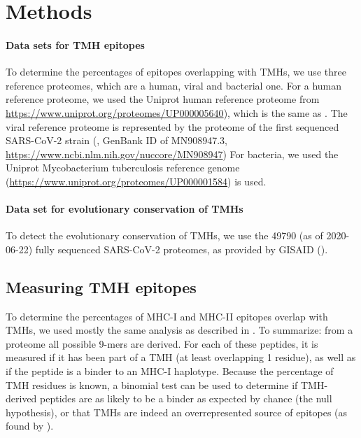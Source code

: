 \section{Methods}

\paragraph{Data sets for TMH epitopes}

To determine the percentages of epitopes overlapping
with TMHs, we use three reference proteomes, which are
a human, viral and bacterial one.
For a human reference proteome, we used the Uniprot human reference proteome
from \url{https://www.uniprot.org/proteomes/UP000005640}), 
which is the same as \cite{bianchi2017}.
The viral reference proteome is represented by
the proteome of the first sequenced SARS-CoV-2 strain (\cite{wu2020new},
GenBank ID of MN908947.3, \url{https://www.ncbi.nlm.nih.gov/nuccore/MN908947})
For bacteria, we used the Uniprot Mycobacterium tuberculosis reference genome
(\url{https://www.uniprot.org/proteomes/UP000001584}) is used.

\paragraph{Data set for evolutionary conservation of TMHs}

To detect the evolutionary conservation of TMHs,
we use the 49790 (as of 2020-06-22) fully sequenced SARS-CoV-2 proteomes, 
as provided by GISAID (\cite{shu2017gisaid}).

\subsection{Measuring TMH epitopes}

To determine the percentages of MHC-I and MHC-II epitopes overlap
with TMHs, we used mostly the same analysis as described in \cite{bianchi2017}.
To summarize: from a proteome all possible 9-mers are derived. For each
of these peptides, it is measured if it has been part of a 
TMH (at least overlapping 1 residue), 
as well as if the peptide is a binder to an MHC-I haplotype.
Because the percentage of TMH residues is known, a binomial test can be
used to determine if TMH-derived peptides are as likely to be a binder
as expected by chance (the null hypothesis), or that TMHs are indeed an
overrepresented source of epitopes (as found by \cite{bianchi2017}).


